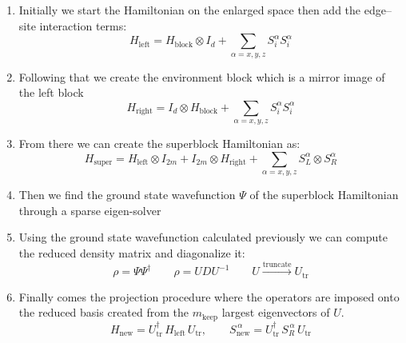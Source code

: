 \documentclass{article}
\begin{document}
\begin{enumerate}
    \item Initially we start the Hamiltonian on the enlarged space then add the edge–site interaction terms:
        \[H_{\text{left}} = H_{\text{block}} \otimes I_d + \sum_{\alpha=x,y,z} S_i^\alpha S_{i}^\alpha\]
    \item Following that we create the environment block which is a mirror image of the left block 
        \[H_{\text{right}} = I_d  \otimes H_{\text{block}} + \sum_{\alpha=x,y,z} S_i^\alpha S_{i}^\alpha\]
    \item From there we can create the superblock Hamiltonian as:
        \[ H_{\mathrm{super}} = H_{\text{left}}\otimes I_{2m} + I_{2m}\otimes H_{\text{right}} + \sum_{\alpha=x,y,z}  S_{L}^{\alpha}\otimes S_{R}^{\alpha}\]
    \item Then we find the ground state wavefunction $\Psi$ of the superblock Hamiltonian through a sparse eigen-solver 
    \item Using the ground state wavefunction calculated previously we can compute the reduced density matrix and diagonalize it: 
        \[\rho = \Psi \Psi^{\dagger} \qquad \rho = U D U^{-1} \qquad U \xrightarrow{\text{truncate}} U_{\text{tr}} \]
    \item Finally comes the projection procedure where the operators are imposed onto the reduced basis created from the $m_{\text{keep}}$ largest eigenvectors of $U$. 
        \[ H_{\text{new}} = U_{\mathrm{tr}}^{\dagger}\,H_{\text{left}}\,U_{\mathrm{tr}}, \qquad S_{\text{new}}^{\,\alpha} = U_{\mathrm{tr}}^{\dagger}\,S_{R}^{\,\alpha}\,U_{\mathrm{tr}} \]
\end{enumerate}

\vspace{1em}
\end{document}
